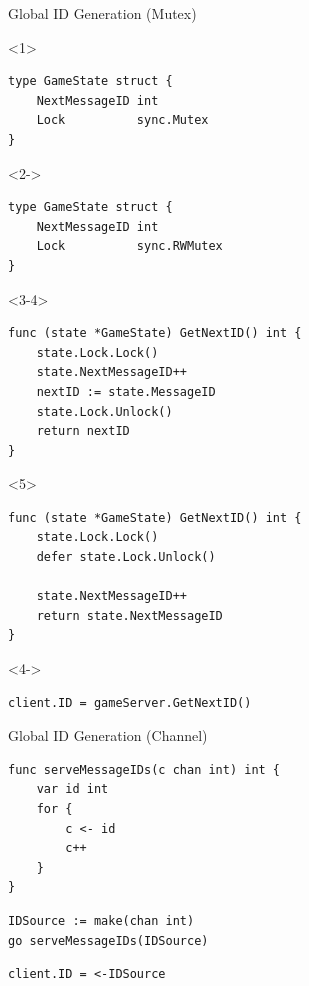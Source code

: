 \documentclass[pdf]{beamer}
\begin{document}
\begin{frame}[fragile]{Global ID Generation (Mutex)}
\begin{onlyenv}<1>
\begin{lstlisting}
type GameState struct {
    NextMessageID int
    Lock          sync.Mutex
}
\end{lstlisting}
\end{onlyenv}
\begin{onlyenv}<2->
\begin{lstlisting}
type GameState struct {
    NextMessageID int
    Lock          sync.RWMutex
}
\end{lstlisting}
\end{onlyenv}
\begin{onlyenv}<3-4>
\begin{lstlisting}
func (state *GameState) GetNextID() int {
    state.Lock.Lock()
    state.NextMessageID++
    nextID := state.MessageID
    state.Lock.Unlock()
    return nextID
}
\end{lstlisting}
\end{onlyenv}
\begin{onlyenv}<5>
\begin{lstlisting}
func (state *GameState) GetNextID() int {
    state.Lock.Lock()
    defer state.Lock.Unlock()

    state.NextMessageID++
    return state.NextMessageID
}
\end{lstlisting}
\end{onlyenv}
\begin{onlyenv}<4->
\begin{lstlisting}
client.ID = gameServer.GetNextID()
\end{lstlisting}
\end{onlyenv}
\end{frame}

\begin{frame}[fragile]{Global ID Generation (Channel)}
\begin{lstlisting}
func serveMessageIDs(c chan int) int {
    var id int
    for {
        c <- id
        c++
    }
}
\end{lstlisting}
\pause
\begin{lstlisting}
IDSource := make(chan int)
go serveMessageIDs(IDSource)
\end{lstlisting}
\pause
\begin{lstlisting}
client.ID = <-IDSource
\end{lstlisting}
\end{frame}
\end{document}
